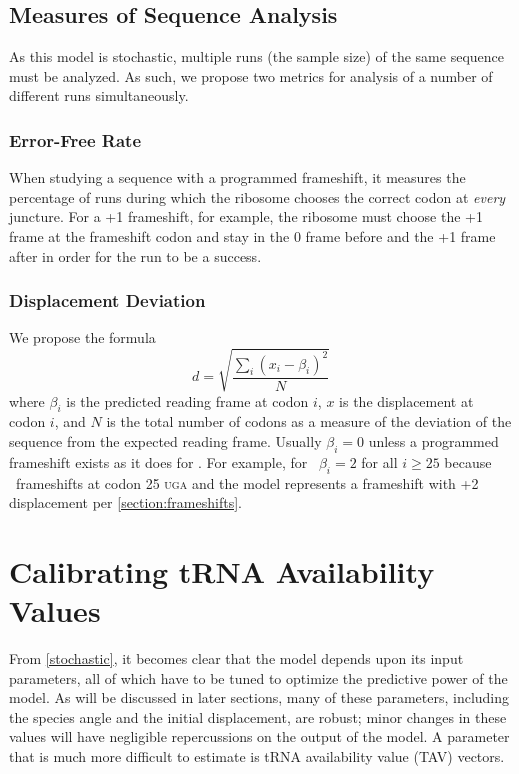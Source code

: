 \documentclass[12pt]{article}
\numberwithin{equation}{section}
\begin{document}
\subsection{Measures of Sequence Analysis}

As this model is stochastic, multiple runs (the sample size) of the same sequence must be analyzed.
As such, we propose two metrics for analysis of a number of different runs 
simultaneously. 

\subsubsection{Error-Free Rate}

When studying a
sequence with a programmed frameshift, it measures the percentage of runs 
during which the ribosome chooses the correct codon
at \emph{every} juncture.  For a +1 frameshift, for example, the ribosome must
choose the +1 frame at the frameshift codon and stay in the 0 frame before
and the +1 frame after in order for the run to be a success.

\subsubsection{Displacement Deviation}
\label{section:deviation}

We propose the formula
\begin{equation}
    \label{eqn:lbd}
    d = \sqrt{\frac{\sum_i \left(x_i - \beta_i\right)^2}{N}}
\end{equation}
where $\beta_i$ is the predicted reading frame at codon $i$, $x$ is the displacement at codon $i$,
and $N$ is the total number of codons as a measure of the deviation of the sequence
from the expected reading frame.  Usually $\beta_i = 0$ unless a
programmed frameshift exists as it does for \prfB.
For example, for \prfB\ $\beta_i = 2$ for all $i \geq 25$ because \prfB\ frameshifts at codon 25 \textsc{uga}
and the model represents a frameshift with +2 displacement per \autoref{section:frameshifts}.

\section{Calibrating tRNA Availability Values}

From \autoref{stochastic}, it becomes clear that the model depends upon
its input parameters, all of which have to be tuned to optimize
the predictive power of the model.  As will be discussed in later sections,
many of these parameters, including the species angle and the initial displacement,
are robust; minor changes in these values will have negligible repercussions
on the output of the model.  A parameter that is much more difficult to estimate
is tRNA availability value (TAV) vectors.
\end{document}
